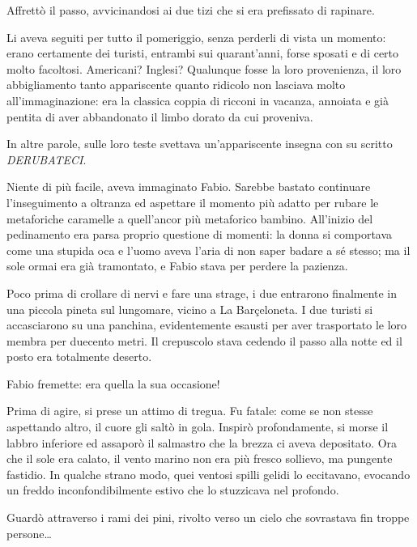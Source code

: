 Affrettò il passo, avvicinandosi ai due tizi che si era prefissato di rapinare. 

Li aveva seguiti per tutto il pomeriggio, senza perderli di vista un momento: erano certamente dei turisti, entrambi sui quarant'anni, forse sposati e di certo molto facoltosi. Americani? Inglesi? Qualunque fosse la loro provenienza, il loro abbigliamento tanto appariscente quanto ridicolo non lasciava molto all'immaginazione: era la classica coppia di ricconi in vacanza, annoiata e già pentita di aver abbandonato il limbo dorato da cui proveniva. 

In altre parole, sulle loro teste svettava un'appariscente insegna con su scritto \textit{DERUBATECI}. 

Niente di più facile, aveva immaginato Fabio. Sarebbe bastato continuare l'inseguimento a oltranza ed aspettare il momento più adatto per rubare le metaforiche caramelle a quell'ancor più metaforico bambino. All'inizio del pedinamento era parsa proprio questione di momenti: la donna si comportava come una stupida oca e l'uomo aveva l'aria di non saper badare a sé stesso; ma il sole ormai era già tramontato, e Fabio stava per perdere la pazienza.

Poco prima di crollare di nervi e fare una strage, i due entrarono finalmente in una piccola pineta sul lungomare, vicino a La Barçeloneta. I due turisti si accasciarono su una panchina, evidentemente esausti per aver trasportato le loro membra per duecento metri. Il crepuscolo stava cedendo il passo alla notte ed il posto era totalmente deserto. 

Fabio fremette: era quella la sua occasione!

Prima di agire, si prese un attimo di tregua. Fu fatale: come se non stesse aspettando altro, il cuore gli saltò in gola. Inspirò profondamente, si morse il labbro inferiore ed assaporò il salmastro che la brezza ci aveva depositato. Ora che il sole era calato, il vento marino non era più fresco sollievo, ma pungente fastidio. In qualche strano modo, quei ventosi spilli gelidi lo eccitavano, evocando un freddo inconfondibilmente estivo che lo stuzzicava nel profondo. 

Guardò attraverso i rami dei pini, rivolto verso un cielo che sovrastava fin troppe persone\ldots

